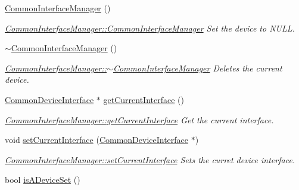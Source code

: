 \begin{DoxyCompactItemize}
\item 
\hypertarget{class_common_interface_manager_a3f970287bd77d17ea41a6795b25ce7e3}{}\label{class_common_interface_manager_a3f970287bd77d17ea41a6795b25ce7e3} 
\hyperlink{class_common_interface_manager_a3f970287bd77d17ea41a6795b25ce7e3}{Common\+Interface\+Manager} ()
\begin{DoxyCompactList}\small\item\em \hyperlink{class_common_interface_manager_a3f970287bd77d17ea41a6795b25ce7e3}{Common\+Interface\+Manager\+::\+Common\+Interface\+Manager} Set the device to N\+U\+LL. \end{DoxyCompactList}\item 
\hypertarget{class_common_interface_manager_ad92cabe2e4f39fd762cf621df5125fa1}{}\label{class_common_interface_manager_ad92cabe2e4f39fd762cf621df5125fa1} 
\hyperlink{class_common_interface_manager_ad92cabe2e4f39fd762cf621df5125fa1}{$\sim$\+Common\+Interface\+Manager} ()
\begin{DoxyCompactList}\small\item\em \hyperlink{class_common_interface_manager_ad92cabe2e4f39fd762cf621df5125fa1}{Common\+Interface\+Manager\+::$\sim$\+Common\+Interface\+Manager} Deletes the current device. \end{DoxyCompactList}\item 
\hyperlink{class_common_device_interface}{Common\+Device\+Interface} $\ast$ \hyperlink{class_common_interface_manager_a24a72b0f78f9e6037e2da899e8170b2f}{get\+Current\+Interface} ()
\begin{DoxyCompactList}\small\item\em \hyperlink{class_common_interface_manager_a24a72b0f78f9e6037e2da899e8170b2f}{Common\+Interface\+Manager\+::get\+Current\+Interface} Get the current interface. \end{DoxyCompactList}\item 
void \hyperlink{class_common_interface_manager_add704853a060d8cca441da322b748c19}{set\+Current\+Interface} (\hyperlink{class_common_device_interface}{Common\+Device\+Interface} $\ast$)
\begin{DoxyCompactList}\small\item\em \hyperlink{class_common_interface_manager_add704853a060d8cca441da322b748c19}{Common\+Interface\+Manager\+::set\+Current\+Interface} Sets the curret device interface. \end{DoxyCompactList}\item 
bool \hyperlink{class_common_interface_manager_abd7a314803309cdb6789eaf36f90b7b7}{is\+A\+Device\+Set} ()

\end{DoxyCompactItemize}
